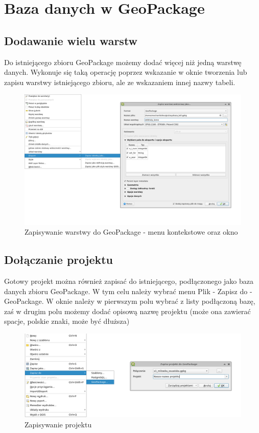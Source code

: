 \documentclass[a4paper,11pt, onecolumn, openany]{memoir}
\begin{document}
		\section{Baza danych w GeoPackage}
			\subsection{Dodawanie wielu warstw}
			Do istniejącego zbioru GeoPackage możemy dodać więcej niż jedną warstwę danych. Wykonuje się taką operację poprzez wskazanie w oknie tworzenia lub zapisu warstwy istniejącego zbioru, ale ze wskazaniem innej nazwy tabeli.
			\begin{figure}[!ht]
				\centering
				\includegraphics[width=15cm]{geopackage-zapisywanie}
				\caption{Zapisywanie warstwy do GeoPackage - menu kontekstowe oraz okno}
			\end{figure} 
			\subsection{Dołączanie projektu}
			Gotowy projekt można również zapisać do istniejącego, podłączonego jako baza danych zbioru GeoPackage. W tym celu należy wybrać menu Plik - Zapisz do - GeoPackage. W oknie należy w pierwszym polu wybrać z listy podłączoną bazę, zaś w drugim polu możemy dodać opisową nazwę projektu (może ona zawierać spacje, polskie znaki, może być dłuższa)
			\begin{figure}[!ht]
				\centering
				\includegraphics[width=15cm]{geopackage-zapis-projektu-menu}
				\caption{Zapisywanie projektu}
			\end{figure} 			
			
\end{document}
